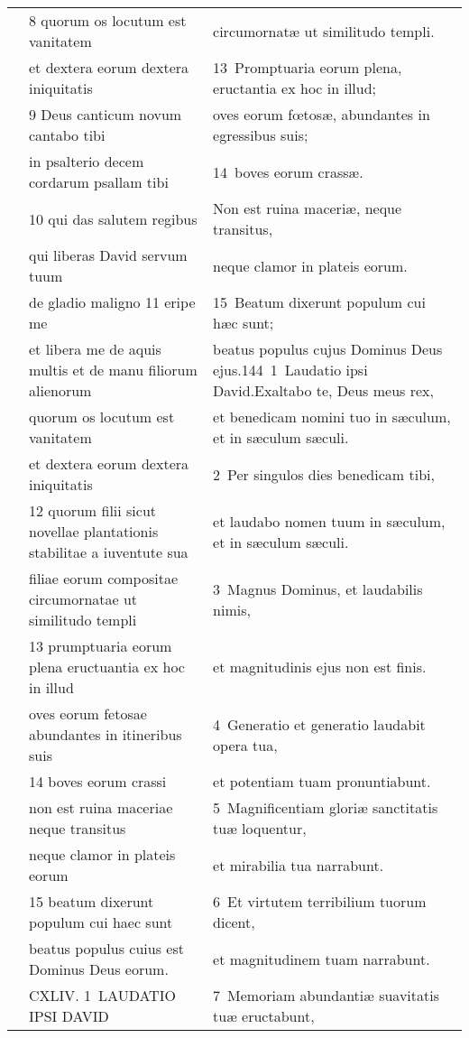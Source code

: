 \documentclass{article}
\begin{document}
\begin{longtable}{@{}p{}p{}p{}@{}}
	&	8 quorum os locutum est vanitatem	&	circumornatæ ut similitudo templi.	\\
	&	et dextera eorum dextera iniquitatis	&	13 Promptuaria eorum plena, eructantia ex hoc in illud;	\\
	&	9 Deus canticum novum cantabo tibi	&	oves eorum fœtosæ, abundantes in egressibus suis;	\\
	&	in psalterio decem cordarum psallam tibi	&	14 boves eorum crassæ.	\\
	&	10 qui das salutem regibus	&	Non est ruina maceriæ, neque transitus,	\\
	&	qui liberas David servum tuum	&	neque clamor in plateis eorum.	\\
	&	de gladio maligno 11 eripe me	&	15 Beatum dixerunt populum cui hæc sunt;	\\
	&	et libera me de aquis multis et de manu filiorum alienorum	&	beatus populus cujus Dominus Deus ejus.144 1 Laudatio ipsi David.Exaltabo te, Deus meus rex,	\\
	&	quorum os locutum est vanitatem	&	et benedicam nomini tuo in sæculum, et in sæculum sæculi.	\\
	&	et dextera eorum dextera iniquitatis	&	2 Per singulos dies benedicam tibi,	\\
	&	12 quorum filii sicut novellae plantationis stabilitae a iuventute sua	&	et laudabo nomen tuum in sæculum, et in sæculum sæculi.	\\
	&	filiae eorum compositae circumornatae ut similitudo templi	&	3 Magnus Dominus, et laudabilis nimis,	\\
	&	13 prumptuaria eorum plena eructuantia ex hoc in illud	&	et magnitudinis ejus non est finis.	\\
	&	oves eorum fetosae abundantes in itineribus suis	&	4 Generatio et generatio laudabit opera tua,	\\
	&	14 boves eorum crassi	&	et potentiam tuam pronuntiabunt.	\\
	&	non est ruina maceriae neque transitus	&	5 Magnificentiam gloriæ sanctitatis tuæ loquentur,	\\
	&	neque clamor in plateis eorum	&	et mirabilia tua narrabunt.	\\
	&	15 beatum dixerunt populum cui haec sunt	&	6 Et virtutem terribilium tuorum dicent,	\\
	&	beatus populus cuius est Dominus Deus eorum.	&	et magnitudinem tuam narrabunt.	\\
	&	CXLIV. 1 LAUDATIO IPSI DAVID	&	7 Memoriam abundantiæ suavitatis tuæ eructabunt,	\\

\end{longtable}
\end{document}
